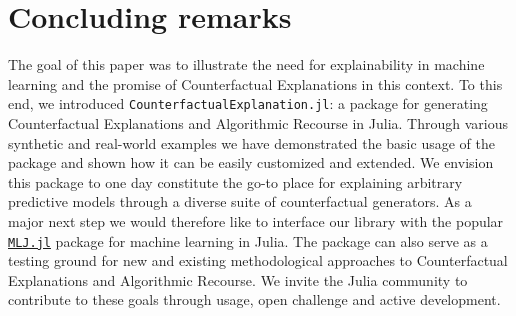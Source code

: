 \documentclass{juliacon}
\begin{document}
\hypertarget{sec-conclude}{%
\section{Concluding remarks}\label{sec-conclude}}

The goal of this paper was to illustrate the need for explainability in
machine learning and the promise of Counterfactual Explanations in this
context. To this end, we introduced
\texttt{CounterfactualExplanation.jl}: a package for generating
Counterfactual Explanations and Algorithmic Recourse in Julia. Through
various synthetic and real-world examples we have demonstrated the basic
usage of the package and shown how it can be easily customized and
extended. We envision this package to one day constitute the go-to place
for explaining arbitrary predictive models through a diverse suite of
counterfactual generators. As a major next step we would therefore like
to interface our library with the popular
\href{https://alan-turing-institute.github.io/MLJ.jl/dev/}{\texttt{MLJ.jl}}
package for machine learning in Julia. The package can also serve as a
testing ground for new and existing methodological approaches to
Counterfactual Explanations and Algorithmic Recourse. We invite the
Julia community to contribute to these goals through usage, open
challenge and active development.


\end{document}
